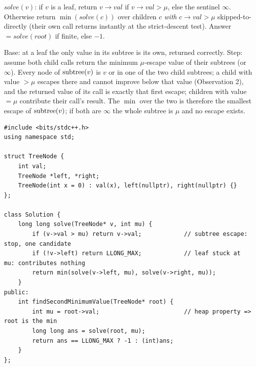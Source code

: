 $\mathit{solve}(v)$: if $v$ is a leaf, return $v\to\mathit{val}$ if
$v\to\mathit{val} > \mu$, else the sentinel $\infty$. Otherwise return
$\min(\mathit{solve}(c))$ over children $c$ \emph{with}
$c\to\mathit{val} > \mu$ skipped-to-directly (their own call returns instantly at
the strict-descent test). Answer $= \mathit{solve}(\mathit{root})$ if finite,
else $-1$.

\begin{proofbox}
Base: at a leaf the only value in its subtree is its own, returned correctly.
Step: assume both child calls return the minimum $\mu$-escape value of their
subtrees (or $\infty$). Every node of $\operatorname{subtree}(v)$ is $v$ or in one of the two
child subtrees; a child with value $> \mu$ escapes there and cannot improve
below that value (Observation 2), and the returned value of its call is exactly
that first escape; children with value $=\mu$ contribute their call's result.
The $\min$ over the two is therefore the smallest escape of $\operatorname{subtree}(v)$; if
both are $\infty$ the whole subtree is $\mu$ and no escape exists.
\end{proofbox}

\begin{lstlisting}[caption={Second Minimum Node (LeetCode 671)}, label={lst:c02-second-min}]
#include <bits/stdc++.h>
using namespace std;

struct TreeNode {
    int val;
    TreeNode *left, *right;
    TreeNode(int x = 0) : val(x), left(nullptr), right(nullptr) {}
};

class Solution {
    long long solve(TreeNode* v, int mu) {
        if (v->val > mu) return v->val;            // subtree escape: stop, one candidate
        if (!v->left) return LLONG_MAX;            // leaf stuck at mu: contributes nothing
        return min(solve(v->left, mu), solve(v->right, mu));
    }
public:
    int findSecondMinimumValue(TreeNode* root) {
        int mu = root->val;                        // heap property => root is the min
        long long ans = solve(root, mu);
        return ans == LLONG_MAX ? -1 : (int)ans;
    }
};
\end{lstlisting}



